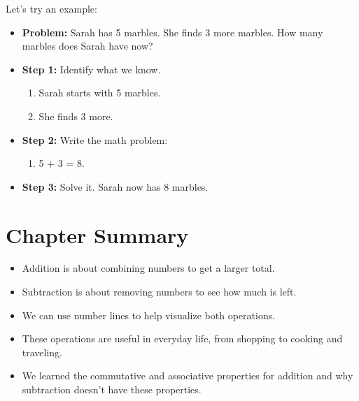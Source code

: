 Let’s try an example:
\begin{itemize}
    \item \textbf{Problem:} Sarah has 5 marbles. She finds 3 more marbles. How many marbles does Sarah have now?
    \item \textbf{Step 1:} Identify what we know.
    \begin{enumerate}
        \item Sarah starts with 5 marbles.
        \item She finds 3 more.
    \end{enumerate}
    \item \textbf{Step 2:} Write the math problem:
    \begin{enumerate}
        \item 5 + 3 = 8.
    \end{enumerate}
    \item \textbf{Step 3:} Solve it. Sarah now has 8 marbles.
\end{itemize}

\section{Chapter Summary}
\begin{itemize}
    \item Addition is about combining numbers to get a larger total.
    \item Subtraction is about removing numbers to see how much is left.
    \item We can use number lines to help visualize both operations.
    \item These operations are useful in everyday life, from shopping to cooking and traveling.
    \item We learned the commutative and associative properties for addition and why subtraction doesn’t have these properties.
\end{itemize}
